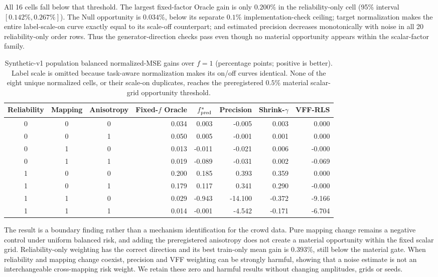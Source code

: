 \documentclass[10pt]{article}
\begin{document}
All 16 cells fall below that threshold.  The largest fixed-factor Oracle gain
is only $0.200\%$ in the reliability-only cell (95\% interval
$[0.142\%,0.267\%]$).  The Null opportunity is $0.034\%$, below its separate
$0.1\%$ implementation-check ceiling; target normalization makes the entire
label-scale-on curve exactly equal to its scale-off counterpart; and estimated
precision decreases monotonically with noise in all 20 reliability-only
order rows. Thus the generator-direction checks pass even though no material
opportunity appears within the scalar-factor family.

\begin{table}[h]
  \centering
  \caption{Synthetic-v1 population balanced normalized-MSE gains over $f=1$
  (percentage points; positive is better). Label scale is omitted because
  task-aware normalization makes its on/off curves identical. None of the
  eight unique normalized cells, or their scale-on duplicates, reaches the
  preregistered $0.5\%$ material scalar-grid opportunity threshold.}
  \label{tab:synthetic_boundary}
  \setlength{\tabcolsep}{4pt}\small
  \begin{tabular}{ccc rrrrr}
    \toprule
    Reliability & Mapping & Anisotropy & Fixed-$f$ Oracle & $f^*_{\rm pred}$ & Precision & Shrink-$\gamma$ & VFF-RLS \\
    \midrule
    0 & 0 & 0 &  0.034 &  0.003 &  -0.005 &  0.003 &  0.000 \\
    0 & 0 & 1 &  0.050 &  0.005 &  -0.001 &  0.001 &  0.000 \\
    0 & 1 & 0 &  0.013 & -0.011 &  -0.021 &  0.006 & -0.000 \\
    0 & 1 & 1 &  0.019 & -0.089 &  -0.031 &  0.002 & -0.069 \\
    1 & 0 & 0 &  0.200 &  0.185 &   0.393 &  0.359 &  0.000 \\
    1 & 0 & 1 &  0.179 &  0.117 &   0.341 &  0.290 & -0.000 \\
    1 & 1 & 0 &  0.029 & -0.943 & -14.100 & -0.372 & -9.166 \\
    1 & 1 & 1 &  0.014 & -0.001 &  -4.542 & -0.171 & -6.704 \\
    \bottomrule
  \end{tabular}
\end{table}

The result is a boundary finding rather than a mechanism identification for
the crowd data.  Pure mapping change remains a negative control under uniform
balanced risk, and adding the preregistered anisotropy does not create a
material opportunity within the fixed scalar grid. Reliability-only weighting has the
correct direction and its best train-only mean gain is $0.393\%$, still below
the material gate.  When reliability and mapping change coexist, precision
and VFF weighting can be strongly harmful, showing that a noise estimate is
not an interchangeable cross-mapping risk weight.  We retain these zero and
harmful results without changing amplitudes, grids or seeds.
\end{document}
